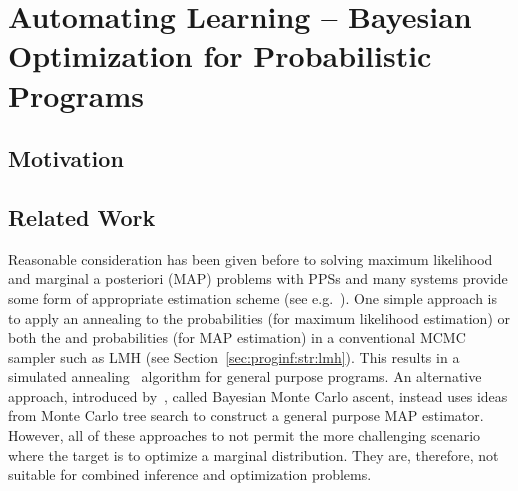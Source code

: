 %

\chapter{Automating Learning -- Bayesian Optimization for Probabilistic Programs}
\label{chp:bopp}



\section{Motivation} 
\label{sec:IntroductionBOPP}



\section{Related Work} 
\label{sec:bopp:related}

Reasonable consideration has been given before to solving maximum likelihood and marginal 
a posteriori (MAP) problems with PPSs and many systems provide some form of appropriate
estimation scheme (see e.g.~\citep{carpenter2015stan,salvatier2016probabilistic}).  One simple
approach is to apply an annealing to the \observe probabilities (for maximum likelihood estimation)
or both the \sample and \observe probabilities (for MAP estimation) in
a conventional MCMC sampler such as LMH (see Section~\ref{sec:proginf:str:lmh}).
This results in a simulated annealing~\citep{aarts1988simulated} algorithm for general purpose programs.
An alternative approach, introduced by~\cite{tolpin-socs-2015}, called Bayesian Monte Carlo ascent,
instead uses ideas from Monte Carlo tree search to construct a general purpose MAP estimator.
However, all of these approaches to not permit the more challenging scenario
where the target is to optimize a marginal distribution.  They are, therefore, not suitable for combined
inference and optimization problems.

